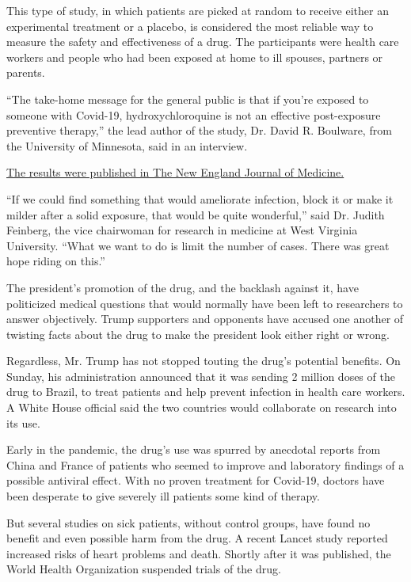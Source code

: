 This type of study, in which patients are picked at random to receive
either an experimental treatment or a placebo, is considered the most
reliable way to measure the safety and effectiveness of a drug. The
participants were health care workers and people who had been exposed at
home to ill spouses, partners or parents.

``The take-home message for the general public is that if you're exposed
to someone with Covid-19, hydroxychloroquine is not an effective
post-exposure preventive therapy,'' the lead author of the study, Dr.
David R. Boulware, from the University of Minnesota, said in an
interview.

\href{https://www.nejm.org/doi/full/10.1056/NEJMoa2016638}{The results
were published in The New England Journal of Medicine.}

``If we could find something that would ameliorate infection, block it
or make it milder after a solid exposure, that would be quite
wonderful,'' said Dr. Judith Feinberg, the vice chairwoman for research
in medicine at West Virginia University. ``What we want to do is limit
the number of cases. There was great hope riding on this.''

The president's promotion of the drug, and the backlash against it, have
politicized medical questions that would normally have been left to
researchers to answer objectively. Trump supporters and opponents have
accused one another of twisting facts about the drug to make the
president look either right or wrong.

Regardless, Mr. Trump has not stopped touting the drug's potential
benefits. On Sunday, his administration announced that it was sending 2
million doses of the drug to Brazil, to treat patients and help prevent
infection in health care workers. A White House official said the two
countries would collaborate on research into its use.

Early in the pandemic, the drug's use was spurred by anecdotal reports
from China and France of patients who seemed to improve and laboratory
findings of a possible antiviral effect. With no proven treatment for
Covid-19, doctors have been desperate to give severely ill patients some
kind of therapy.

But several studies on sick patients, without control groups, have found
no benefit and even possible harm from the drug. A recent Lancet study
reported increased risks of heart problems and death. Shortly after it
was published, the World Health Organization suspended trials of the
drug.

